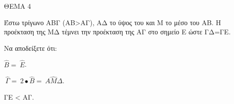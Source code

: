 
ΘΕΜΑ 4

Έστω τρίγωνο ΑΒΓ (ΑΒ\textgreater ΑΓ), ΑΔ το ύψος του και Μ το μέσο του ΑΒ. Η προέκταση της ΜΔ τέμνει την προέκταση της ΑΓ στο σημείο Ε ώστε ΓΔ=ΓΕ.

Να αποδείξετε ότι:

\begin{alist}
\item $\widehat{Β} = \ \widehat{Ε}$. 

\item $\ \widehat{\Gamma} = \ 2 \bullet \widehat{Β} = \ Α\widehat{Μ}\Delta$. 

\item ΓΕ \textless{} ΑΓ. 


\end{alist}
